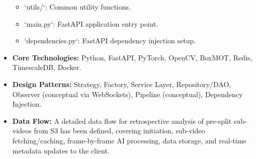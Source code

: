 \begin{itemize}
\begin{itemize}
            \item `utils/`: Common utility functions.
            \item `main.py`: FastAPI application entry point.
            \item `dependencies.py`: FastAPI dependency injection setup.
        \end{itemize}
    \item \textbf{Core Technologies:} Python, FastAPI, PyTorch, OpenCV, BoxMOT, Redis, TimescaleDB, Docker.
    \item \textbf{Design Patterns:} Strategy, Factory, Service Layer, Repository/DAO, Observer (conceptual via WebSockets), Pipeline (conceptual), Dependency Injection.
    \item \textbf{Data Flow:} A detailed data flow for retrospective analysis of pre-split sub-videos from S3 has been defined, covering initiation, sub-video fetching/caching, frame-by-frame AI processing, data storage, and real-time metadata updates to the client.
\end{itemize}


